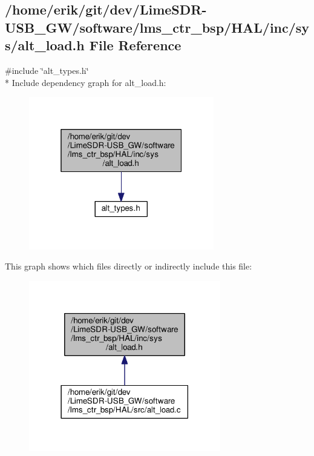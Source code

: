 \subsection{/home/erik/git/dev/\+Lime\+S\+D\+R-\/\+U\+S\+B\+\_\+\+G\+W/software/lms\+\_\+ctr\+\_\+bsp/\+H\+A\+L/inc/sys/alt\+\_\+load.h File Reference}
\label{alt__load_8h}
{\ttfamily \#include \char`\"{}alt\+\_\+types.\+h\char`\"{}}\\*
Include dependency graph for alt\+\_\+load.\+h\+:
\nopagebreak
\begin{figure}[H]
\begin{center}
\leavevmode
\includegraphics[width=229pt]{d0/d8b/alt__load_8h__incl}
\end{center}
\end{figure}
This graph shows which files directly or indirectly include this file\+:
\nopagebreak
\begin{figure}[H]
\begin{center}
\leavevmode
\includegraphics[width=237pt]{da/d3d/alt__load_8h__dep__incl}
\end{center}
\end{figure}
